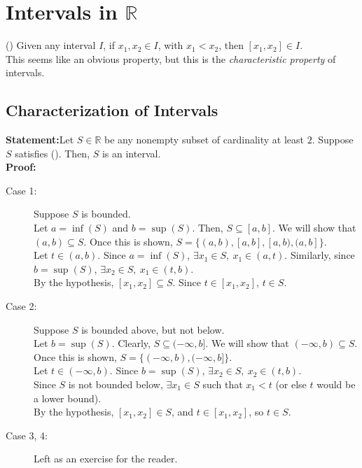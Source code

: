 \documentclass[10pt]{extarticle}
\newcommand{\R}{\mathbb{R}}
\begin{document}
  \section{Intervals in $\R$}%
    (\textasteriskcentered) Given any interval $I$, if $x_1,x_2\in I$, with $x_1 < x_2$, then $[x_1,x_2]\in I$.\\

    This seems like an obvious property, but this is the \textsl{characteristic property} of intervals.
    \subsection{Characterization of Intervals}%
    \textbf{Statement:}Let $S\in\R$ be any nonempty subset of cardinality at least $2$. Suppose $S$ satisfies (\textasteriskcentered). Then, $S$ is an interval.\\

    \textbf{Proof:}
      \begin{description}
        \item[Case 1:] Suppose $S$ is bounded.\\

          Let $a = \inf(S)$ and $b = \sup(S)$. Then, $S \subseteq [a,b]$. We will show that $(a,b)\subseteq S$. Once this is shown, $S = \{(a,b), [a,b], [a,b), (a,b]\}$.\\

          Let $t\in (a,b)$. Since $a = \inf(S)$, $\exists x_1\in S,~x_1 \in (a,t)$. Similarly, since $b = \sup(S)$, $\exists x_2\in S,~x_1\in (t,b)$.\\

          By the hypothesis, $[x_1,x_2]\subseteq S$. Since $t\in [x_1,x_2]$, $t\in S$.
        \item[Case 2:] Suppose $S$ is bounded above, but not below.\\

          Let $b = \sup(S)$. Clearly, $S \subseteq (-\infty,b]$. We will show that $(-\infty,b)\subseteq S$. Once this is shown, $S = \{(-\infty,b), (-\infty,b]\}$.\\

          Let $t\in (-\infty,b)$. Since $b = \sup(S)$, $\exists x_2\in S,~x_2\in (t,b)$.\\

          Since $S$ is not bounded below, $\exists x_1\in S$ such that $x_1 < t$ (or else $t$ would be a lower bound).\\

          By the hypothesis, $[x_1,x_2]\in S$, and $t\in [x_1,x_2]$, so $t\in S$.
        \item[Case 3, 4:] Left as an exercise for the reader.
      \end{description}
\end{document}
